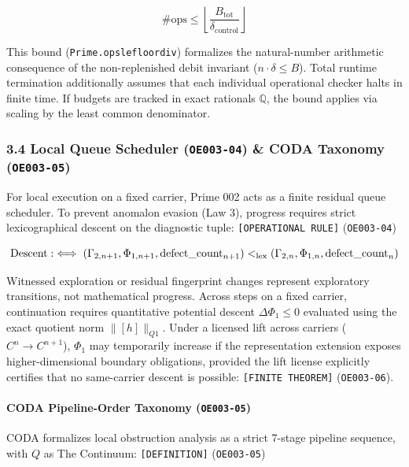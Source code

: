 \documentclass[
  11pt,
]{article}
\renewcommand{\_}{\origunderscore\allowbreak}
\begin{document}
\[\#\mathrm{ops} \le \left\lfloor \frac{B_{\text{tot}}}{\delta_{\text{control}}} \right\rfloor\]

This bound (\texttt{Prime.ops\_le\_floor\_div}) formalizes the
natural-number arithmetic consequence of the non-replenished debit
invariant (\(n \cdot \delta \le B\)). Total runtime termination
additionally assumes that each individual operational checker halts in
finite time. If budgets are tracked in exact rationals \(\mathbb{Q}\),
the bound applies via scaling by the least common denominator.

\subsubsection{\texorpdfstring{3.4 Local Queue Scheduler
(\texttt{OE003-04}) \& CODA Taxonomy
(\texttt{OE003-05})}{3.4 Local Queue Scheduler (OE003-04) \& CODA Taxonomy (OE003-05)}}\label{local-queue-scheduler-oe003-04-coda-taxonomy-oe003-05}

For local execution on a fixed carrier, Prime 002 acts as a finite
residual queue scheduler. To prevent anomalon evasion (Law 3), progress
requires strict lexicographical descent on the diagnostic tuple:
\texttt{{[}OPERATIONAL\ RULE{]}} (\texttt{OE003-04})

\[\text{Descent} :\iff (\Gamma_{2, n+1}, \Phi_{1, n+1}, \text{defect\_count}_{n+1}) <_{\text{lex}} (\Gamma_{2, n}, \Phi_{1, n}, \text{defect\_count}_n)\]

Witnessed exploration or residual fingerprint changes represent
exploratory transitions, not mathematical progress. Across steps on a
fixed carrier, continuation requires quantitative potential descent
\(\Delta \Phi_1 \le 0\) evaluated using the exact quotient norm
\(\|[h]\|_{Q1}\). Under a licensed lift across carriers
(\(C^n \to C^{n+1}\)), \(\Phi_1\) may temporarily increase if the
representation extension exposes higher-dimensional boundary
obligations, provided the lift license explicitly certifies that no
same-carrier descent is possible: \texttt{{[}FINITE\ THEOREM{]}}
(\texttt{OE003-06}).

\paragraph{\texorpdfstring{CODA Pipeline-Order Taxonomy
(\texttt{OE003-05})}{CODA Pipeline-Order Taxonomy (OE003-05)}}\label{coda-pipeline-order-taxonomy-oe003-05}

CODA formalizes local obstruction analysis as a strict 7-stage pipeline
sequence, with \(Q\) as The Continuum: \texttt{{[}DEFINITION{]}}
(\texttt{OE003-05})
\end{document}
